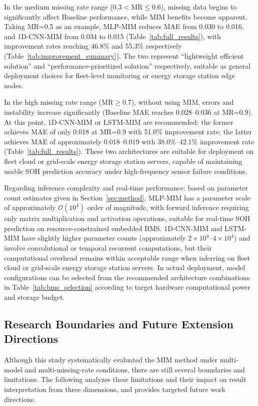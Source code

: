 \documentclass[5p,times]{elsarticle}
\begin{document}
In the medium missing rate range (0.3$<$MR$\leq$0.6), missing data begins to significantly affect Baseline performance, while MIM benefits become apparent. Taking MR=0.5 as an example, MLP-MIM reduces MAE from 0.030 to 0.016, and 1D-CNN-MIM from 0.034 to 0.015 (Table~\ref{tab:full_results}), with improvement rates reaching 46.8\% and 55.3\% respectively (Table~\ref{tab:improvement_summary}). The two represent ``lightweight efficient solution'' and ``performance-prioritized solution'' respectively, suitable as general deployment choices for fleet-level monitoring or energy storage station edge nodes.

In the high missing rate range (MR$\geq$0.7), without using MIM, errors and instability increase significantly (Baseline MAE reaches 0.028--0.036 at MR=0.9). At this point, 1D-CNN-MIM or LSTM-MIM are recommended: the former achieves MAE of only 0.018 at MR=0.9 with 51.0\% improvement rate; the latter achieves MAE of approximately 0.018--0.019 with 38.0\%--42.1\% improvement rate (Table~\ref{tab:full_results}). These two architectures are suitable for deployment on fleet cloud or grid-scale energy storage station servers, capable of maintaining usable SOH prediction accuracy under high-frequency sensor failure conditions.

Regarding inference complexity and real-time performance: based on parameter count estimates given in Section~\ref{sec:method}, MLP-MIM has a parameter scale of approximately $\mathcal{O}(10^4)$ order of magnitude, with forward inference requiring only matrix multiplication and activation operations, suitable for real-time SOH prediction on resource-constrained embedded BMS. 1D-CNN-MIM and LSTM-MIM have slightly higher parameter counts (approximately $2\times10^4$--$4\times10^4$) and involve convolutional or temporal recurrent computations, but their computational overhead remains within acceptable range when inferring on fleet cloud or grid-scale energy storage station servers. In actual deployment, model configurations can be selected from the recommended architecture combinations in Table~\ref{tab:bms_selection} according to target hardware computational power and storage budget.

\subsection{Research Boundaries and Future Extension Directions}

Although this study systematically evaluated the MIM method under multi-model and multi-missing-rate conditions, there are still several boundaries and limitations. The following analyzes these limitations and their impact on result interpretation from three dimensions, and provides targeted future work directions.
\end{document}
